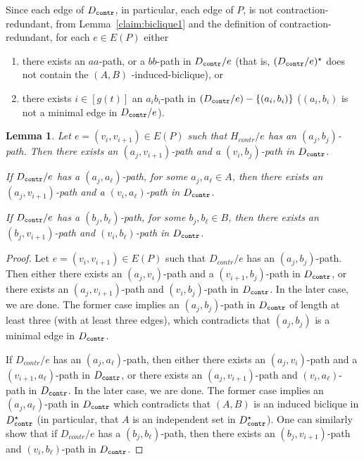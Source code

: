 \documentclass[a4paper,11pt]{article}
\theoremstyle{plain}
\newtheorem{lemma}[theorem]{Lemma}
\newtheorem{identification rule}{Identification Rule}
\theoremstyle{definition}
\theoremstyle{remark}
\newcommand{\contr}{\textnormal{\texttt{contr}}}
\newcommand{\Dcontr}{D_{\contr}}
\begin{document}
Since each edge of $\Dcontr$, in particular, each edge of $P$, is not contraction-redundant, from Lemma~\ref{claim:biclique1} and the definition of contraction-redundant, for each $e \in E(P)$ either
\begin{enumerate}
\item there exists an $aa$-path, or a $bb$-path in $\Dcontr/e$ (that is, $(\Dcontr/e)^{\star}$ does not contain the $(A,B)$ -induced-biclique), or 
\item there exists $i \in [g(t)]$ an $a_{i}b_{i}$-path in $(\Dcontr/e )- \{(a_{i},b_{i})\}$ ($(a_{i},b_{i})$ is not a minimal edge in $\Dcontr/e$).
\end{enumerate}

\begin{lemma}\label{obs:biclique1-source-lemma}
Let $e=(v_i,v_{i+1}) \in E(P)$ such that $H_{contr}/e$ has an $(a_j,b_j)$-path. Then there exists an $(a_j,v_{i+1})$-path and a $(v_i,b_j)$-path in $\Dcontr$.

If $\Dcontr/e$ has a $(a_j,a_{\ell})$-path, for some $a_j,a_{\ell} \in A$, then there exists an $(a_j, v_{i+1})$-path and a $(v_i,a_{\ell})$-path in $\Dcontr$.

If $\Dcontr/e$ has a $(b_j,b_{\ell})$-path, for some $b_j,b_{\ell} \in B$, then there exists an $(b_j, v_{i+1})$-path and $(v_i,b_{\ell})$-path in $\Dcontr$.
\end{lemma}

\begin{proof}
Let $e=(v_i,v_{i+1}) \in E(P)$ such that $D_{contr}/e$ has an $(a_j,b_j)$-path. Then either there exists an $(a_j,v_i)$-path and a $(v_{i+1},b_j)$-path in $\Dcontr$, or there exists an $(a_j,v_{i+1})$-path and $(v_i,b_j)$-path in $\Dcontr$. In the later case, we are done. The former case implies an $(a_j,b_j)$-path in $\Dcontr$ of length at least three (with at least three edges), which contradicts that $(a_j,b_j)$ is a minimal edge in $\Dcontr$.

If $D_{contr}/e$ has an $(a_j,a_{\ell})$-path, then either there exists an $(a_j,v_i)$-path and a $(v_{i+1},a_{\ell})$-path in $\Dcontr$, or there exists an $(a_j,v_{i+1})$-path and $(v_i,a_{\ell})$-path in $\Dcontr$. In the later case, we are done. The former case implies an $(a_j,a_{\ell})$-path in $\Dcontr$ which contradicts that $(A,B)$ is an induced biclique in $\Dcontr^{\star}$ (in particular, that $A$ is an independent set in $\Dcontr^{\star}$).
One can similarly show that if $D_{contr}/e$ has a $(b_j,b_{\ell})$-path, then there exists an $(b_j,v_{i+1})$-path and $(v_i,b_{\ell})$-path in $\Dcontr$.
\end{proof}
\end{document}

